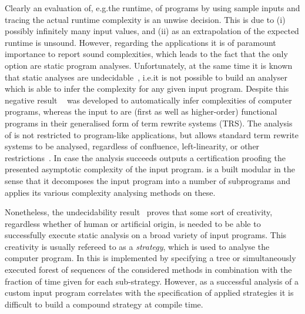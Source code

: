 \documentclass[envcountsame]{llncs}
\begin{document}
Clearly an evaluation of, e.g.\@ the runtime, of programs by using sample inputs and tracing the
actual runtime complexity is an unwise decision. This is due to (i) possibly infinitely many input
values, and (ii) as an extrapolation of the expected runtime is unsound. However, regarding the
applications it is of paramount importance to report sound complexities, which leads to the fact
that the only option are static program analyses. Unfortunately, at the same time it is known that
static analyses are undecidable~\cite{landi1992undecidability}, i.e.\@ it is not possible to build
an analyser which is able to infer the complexity for any given input program.
%
Despite this negative result \tct{}~\cite{avanzini2016tct} was developed to automatically infer
complexities of computer programs, whereas the input to \tct{} are (first as well as higher-order)
functional programs in their generalised form of term rewrite systems (TRS). The analysis of \tct{}
is not restricted to program-like applications, but allows standard term rewrite systems to be
analysed, regardless of confluence, left-linearity, or other restrictions~\cite{avanzini2016tct}. In
case the analysis succeeds \tct{} outputs a certification proofing the presented asymptotic
complexity of the input program. \tct{} is a built modular in the sense that it decomposes the input
program into a number of subprograms and applies its various complexity analysing methods on these.%

Nonetheless, the undecidability result~\cite{landi1992undecidability} proves that some sort of
creativity, regardless whether of human or artificial origin, is needed to be able to successfully
execute static analysis on a broad variety of input programs. This creativity is usually refereed to
as a \textit{strategy}, which is used to analyse the computer program. In \tct{} this is implemented
by specifying a tree or simultaneously executed forest of sequences of the considered methods in
combination with the fraction of time given for each sub-strategy. However, as a successful analysis
of a custom input program correlates with the specification of applied strategies it is difficult to
build a compound strategy at compile time.
\end{document}
